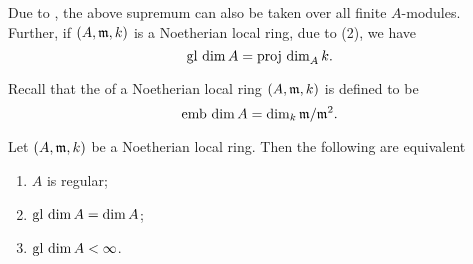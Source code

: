 Due to , the above supremum can also be taken over all finite $A$-modules. Further, if $(A,\mathfrak{m}, k)$ is a Noetherian local ring, due to  (2), we have 
\begin{equation*}
    \operatorname{gl~dim} A = \operatorname{proj~dim}_A k.
\end{equation*}

Recall that the  of a Noetherian local ring $(A,\mathfrak{m}, k)$ is defined to be 
\begin{equation*}
    \operatorname{emb~dim} A = \dim_k \mathfrak{m}/\mathfrak{m}^2.
\end{equation*}

\begin{theorem}[Serre]
    Let $(A,\mathfrak{m}, k)$ be a Noetherian local ring. Then the following are equivalent 
    \begin{enumerate}[label=(\arabic*)]
        \item $A$ is regular;
        \item $\operatorname{gl~dim} A = \dim A$; 
        \item $\operatorname{gl~dim} A < \infty$.
    \end{enumerate}
\end{theorem}
